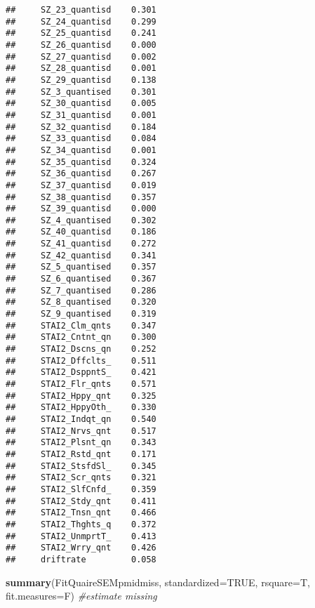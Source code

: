 \documentclass[]{article}
\newenvironment{Shaded}{\begin{snugshade}}{\end{snugshade}}
\newcommand{\KeywordTok}[1]{\textcolor[rgb]{0.13,0.29,0.53}{\textbf{#1}}}
\newcommand{\DataTypeTok}[1]{\textcolor[rgb]{0.13,0.29,0.53}{#1}}
\newcommand{\CommentTok}[1]{\textcolor[rgb]{0.56,0.35,0.01}{\textit{#1}}}
\newcommand{\OtherTok}[1]{\textcolor[rgb]{0.56,0.35,0.01}{#1}}
\newcommand{\NormalTok}[1]{#1}
\begin{document}
\begin{verbatim}
##     SZ_23_quantisd    0.301
##     SZ_24_quantisd    0.299
##     SZ_25_quantisd    0.241
##     SZ_26_quantisd    0.000
##     SZ_27_quantisd    0.002
##     SZ_28_quantisd    0.001
##     SZ_29_quantisd    0.138
##     SZ_3_quantised    0.301
##     SZ_30_quantisd    0.005
##     SZ_31_quantisd    0.001
##     SZ_32_quantisd    0.184
##     SZ_33_quantisd    0.084
##     SZ_34_quantisd    0.001
##     SZ_35_quantisd    0.324
##     SZ_36_quantisd    0.267
##     SZ_37_quantisd    0.019
##     SZ_38_quantisd    0.357
##     SZ_39_quantisd    0.000
##     SZ_4_quantised    0.302
##     SZ_40_quantisd    0.186
##     SZ_41_quantisd    0.272
##     SZ_42_quantisd    0.341
##     SZ_5_quantised    0.357
##     SZ_6_quantised    0.367
##     SZ_7_quantised    0.286
##     SZ_8_quantised    0.320
##     SZ_9_quantised    0.319
##     STAI2_Clm_qnts    0.347
##     STAI2_Cntnt_qn    0.300
##     STAI2_Dscns_qn    0.252
##     STAI2_Dffclts_    0.511
##     STAI2_DsppntS_    0.421
##     STAI2_Flr_qnts    0.571
##     STAI2_Hppy_qnt    0.325
##     STAI2_HppyOth_    0.330
##     STAI2_Indqt_qn    0.540
##     STAI2_Nrvs_qnt    0.517
##     STAI2_Plsnt_qn    0.343
##     STAI2_Rstd_qnt    0.171
##     STAI2_StsfdSl_    0.345
##     STAI2_Scr_qnts    0.321
##     STAI2_SlfCnfd_    0.359
##     STAI2_Stdy_qnt    0.411
##     STAI2_Tnsn_qnt    0.466
##     STAI2_Thghts_q    0.372
##     STAI2_UnmprtT_    0.413
##     STAI2_Wrry_qnt    0.426
##     driftrate         0.058
\end{verbatim}

\begin{Shaded}
\begin{Highlighting}[]
\KeywordTok{summary}\NormalTok{(FitQuaireSEMpmidmiss, }\DataTypeTok{standardized=}\OtherTok{TRUE}\NormalTok{, }\DataTypeTok{rsquare=}\NormalTok{T, }\DataTypeTok{fit.measures=}\NormalTok{F) }\CommentTok{#estimate missing}
\end{Highlighting}
\end{Shaded}
\end{document}
